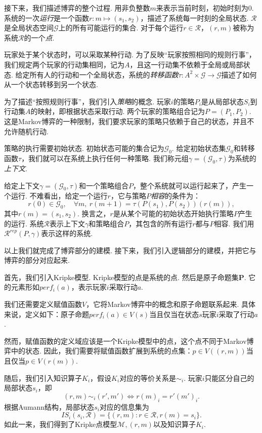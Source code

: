 接下来，我们描述博弈的整个过程. 用非负整数$m$来表示当前时刻，初始时刻为$0$. 系统的一次\textit{运行}是一个函数$r: m \mapsto (s_1, s_2)$，描述了系统每一时刻的全局状态. $\mathcal{R}$是全局状态空间$\mathcal{G}$上的所有可能运行的集合. 对于每个运行$r \in \mathcal{R}$，$(r, m)$被称为系统$\mathcal{R}$的一个\textit{点}. 

玩家处于某个状态时，可以采取某种行动. 为了反映“玩家按照相同的规则行事”，我们规定两个玩家的行动集相同，记为$A$，且这一行动集不依赖于全局或局部状态. 给定所有人的行动和一个全局状态，系统的\textit{转移函数}$\tau: A^2 \times \mathcal{G} \to \mathcal{G}$描述了如何从一个状态转移到另一个状态. 

为了描述“按照规则行事”，我们引入\textit{策略}的概念. 玩家$i$的策略$P_i$是从局部状态$S_i$到行动集$A$的映射，即根据状态采取行动. 两个玩家的策略组合记为$P = (P_1, P_2)$. 这是Markov博弈的一种限制，我们要求玩家的策略只依赖于自己的状态，并且不允许随机行动. 

策略的执行需要初始状态. 初始状态可能的集合记为$\mathcal{G}_0$. 给定初始状态集$\mathcal{G}_0$和转移函数$\tau$，我们就可以在系统上执行任何一种策略. 我们称元组$\gamma = (\mathcal{G}_0, \tau)$为系统的\textit{上下文}. 

给定上下文$\gamma = (\mathcal{G}_0, \tau)$和一个策略组合$P$，整个系统就可以运行起来了，产生一个运行. 不难看出，给定一个运行$r$，它与策略$P$\textit{相容}的条件为：
\[
r(0) \in \mathcal{G}_0, \quad \forall m,\ r(m+1) = \tau(P(s_1), P(s_2))(r(m)),
\]
其中$r(m) = (s_1, s_2)$. 换言之，$r$是从某个可能的初始状态开始执行策略$P$产生的运行. 系统$\mathcal{R}$表示上下文$\gamma$和策略组合$P$，其包含的所有运行$r$都与$P$相容. 我们用$\mathcal{R}^{rep}(P, \gamma)$表示这样的系统. 

以上我们就完成了博弈部分的建模. 接下来，我们引入逻辑部分的建模，并把它与博弈的部分对应起来. 

首先，我们引入Kripke模型. Kripke模型的点是系统的点. 然后是原子命题集$\mathbf{P}$. 它的元素形如$perf_i(a)$，表示玩家$i$采取行动$a$. 

我们还需要定义赋值函数$V$，它将Markov博弈中的概念和原子命题联系起来. 具体来说，定义如下：原子命题$perf_i(a)\in V(s)$当且仅当在状态$s$玩家$i$采取了行动$a$. 

然而，赋值函数的定义域应该是一个Kripke模型中的点，这个点不同于Markov博弈中的状态. 因此，我们需要将赋值函数扩展到系统的点集：$p \in V((r, m))$当且仅当$p\in V(r(m))$. 

随后，我们引入知识算子$K_i$，假设$K_i$对应的等价关系是$\sim_i$. 玩家$i$只能区分自己的局部状态$s_i$，即
\[(r, m) \sim_i (r', m')\iff r(m)_i = r'(m')_i.\]
根据Aumann结构，局部状态$s_i$对应的信息集为
\[
IS_i(s_i, \mathcal{R}) = \{(r, m): r \in \mathcal{R}, r(m) = s_i\}.
\]
如此一来，我们得到了Kripke点模型$\mathcal{M}, (r, m)$以及知识算子$K_i$.

